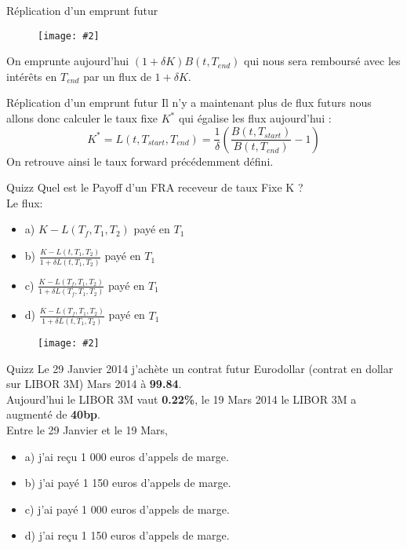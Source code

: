 \documentclass{beamer}
\newcommand{\FIG}[2]{\texttt{[image: \#2]}}
\begin{document}
\begin{frame}{Réplication d'un emprunt futur}
\begin{center}
\begin{figure}[h]
\FIG{4in}{figures/fwd_replic3.png}
\end{figure}
\end{center}
On emprunte aujourd'hui $(1+\delta K)B(t,T_{end})$ qui nous sera remboursé avec les intérêts en $T_{end}$ par un flux de $1+\delta K$.
\end{frame}

\begin{frame}{Réplication d'un emprunt futur}
Il n'y a maintenant plus de flux futurs nous allons donc calculer le taux fixe $K^*$ qui égalise les flux aujourd'hui :
\[
K^*=L(t,T_{start}, T_{end})=\frac{1}{\delta}\left(\frac{B(t,T_{start})}{B(t,T_{end})}-1\right)
\]
On retrouve ainsi le taux forward précédemment défini.
\end{frame}

\begin{frame}{Quizz}
Quel est le Payoff d'un FRA receveur de taux Fixe K ?\\
\vspace{0.5cm}
Le flux:
\begin{itemize}
\item a) $K - L(T_f,T_{1},T_{2})$ payé en $T_1$
\item b) $\frac{K - L(t,T_{1},T_{2})}{1+\delta  L(t,T_{1},T_{2})}$ payé en $T_1$
\item c) $\frac{K - L(T_f,T_{1},T_{2})}{1+\delta  L(T_f,T_{1},T_{2})}$ payé en $T_1$
\item d) $\frac{K - L(T_f,T_{1},T_{2})}{1+\delta  L(t,T_{1},T_{2})}$ payé en $T_1$
\end{itemize}
\begin{figure}[h]
\FIG{10cm}{figures/schema_fra.jpg}
\end{figure}

\end{frame}

\begin{frame}{Quizz}
Le 29 Janvier 2014 j'achète un contrat futur Eurodollar (contrat en dollar sur LIBOR 3M) Mars 2014 à \textbf{99.84}.\\
Aujourd'hui le LIBOR 3M vaut \textbf{0.22\%}, le 19 Mars 2014 le LIBOR 3M a augmenté de \textbf{40bp}.\\
\vspace{0.5cm}
Entre le 29 Janvier et le 19 Mars,\\
\begin{itemize}
\item a) j'ai reçu 1 000 euros d'appels de marge.
\item b) j'ai payé 1 150 euros d'appels de marge.
\item c) j'ai payé 1 000 euros d'appels de marge.
\item d) j'ai reçu 1 150 euros d'appels de marge.
\end{itemize}
\end{frame}
\end{document}
